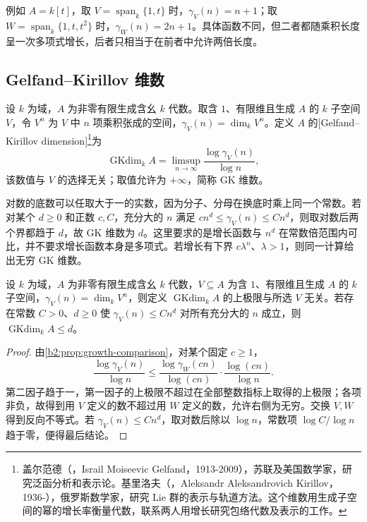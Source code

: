 例如 \(A=k[t]\)，取 \(V=\operatorname{span}_k\{1,t\}\) 时，\(\gamma_V(n)=n+1\)；取 \(W=\operatorname{span}_k\{1,t,t^2\}\) 时，\(\gamma_W(n)=2n+1\)。具体函数不同，但二者都随乘积长度呈一次多项式增长，后者只相当于在前者中允许两倍长度。

\subsection{Gelfand–Kirillov 维数}
\label{b2:subsec:1904:02}

\begin{definition}\label{b2:def:gk-dimension}
	设 \(k\) 为域，\(A\) 为非零有限生成含幺 \(k\) 代数。取含 \(1\)、有限维且生成 \(A\) 的 \(k\) 子空间 \(V\)，令 \(V^n\) 为 \(V\) 中 \(n\) 项乘积张成的空间，\(\gamma_V(n)=\dim_kV^n\)。定义 \(A\) 的[Gelfand–Kirillov dimension]\footnote{盖尔范德（，Israil Moiseevic Gelfand，1913-2009），苏联及美国数学家，研究泛函分析和表示论。基里洛夫（，Aleksandr Aleksandrovich Kirillov，1936-），俄罗斯数学家，研究 Lie 群的表示与轨道方法。这个维数用生成子空间的幂的增长率衡量代数，联系两人用增长研究包络代数及表示的工作。}为
	\[
		\operatorname{GKdim}_kA =\limsup_{n\to\infty}\frac{\log\gamma_V(n)}{\log n},
	\]
	该数值与 \(V\) 的选择无关；取值允许为 \(+\infty\)，简称 GK 维数。
\end{definition}

对数的底数可以任取大于一的实数，因为分子、分母在换底时乘上同一个常数。若对某个 \(d\ge0\) 和正数 \(c,C\)，充分大的 \(n\) 满足 \(cn^d\le\gamma_V(n)\le Cn^d\)，则取对数后两个界都趋于 \(d\)，故 GK 维数为 \(d\)。这里要求的是增长函数与 \(n^d\) 在常数倍范围内可比，并不要求增长函数本身是多项式。若增长有下界 \(c\lambda^n\)、\(\lambda>1\)，则同一计算给出无穷 GK 维数。

\begin{proposition}\label{b2:prop:gk-independent}
	设 \(k\) 为域，\(A\) 为非零有限生成含幺 \(k\) 代数，\(V\subseteq A\) 为含 \(1\)、有限维且生成 \(A\) 的 \(k\) 子空间，\(\gamma_V(n)=\dim_kV^n\)，则定义 \(\operatorname{GKdim}_kA\) 的上极限与所选 \(V\) 无关。若存在常数 \(C>0\)、\(d\geq0\) 使 \(\gamma_V(n)\leq Cn^d\) 对所有充分大的 \(n\) 成立，则 \(\operatorname{GKdim}_kA\le d\)。
\end{proposition}
\begin{proof}
	由\cref{b2:prop:growth-comparison}，对某个固定 \(c\ge1\)，
	\[
		\frac{\log\gamma_V(n)}{\log n} \le \frac{\log\gamma_W(cn)}{\log(cn)} \cdot\frac{\log(cn)}{\log n}.
	\]
	第二因子趋于一，第一因子的上极限不超过在全部整数指标上取得的上极限；各项非负，故得到用 \(V\) 定义的数不超过用 \(W\) 定义的数，允许右侧为无穷。交换 \(V,W\) 得到反向不等式。若 \(\gamma_V(n)\le Cn^d\)，取对数后除以 \(\log n\)，常数项 \(\log C/\log n\) 趋于零，便得最后结论。
\end{proof}

